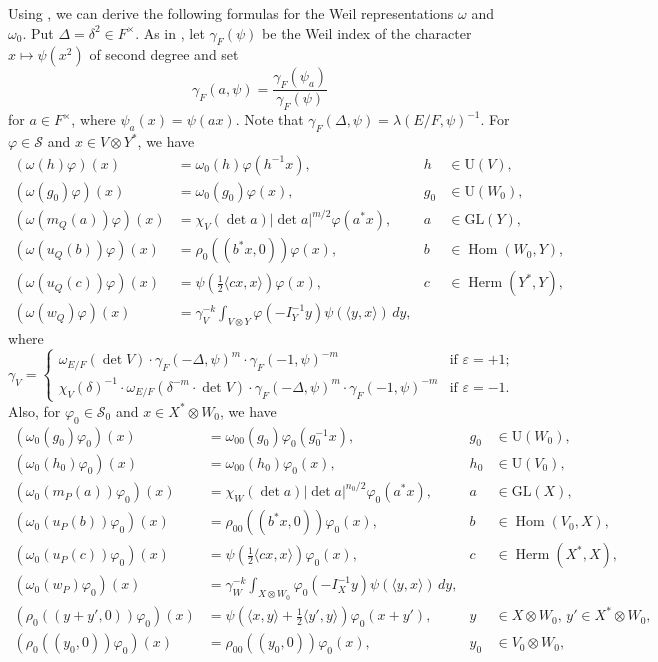\documentclass[11pt]{amsart}
\numberwithin{equation}{section}
\theoremstyle{plain}
\theoremstyle{definition}
\theoremstyle{remark}
\def\Herm{\operatorname{Herm}}
\def\Hom{\operatorname{Hom}}
\def\GL{\mathrm{GL}}
\def\U{\mathrm{U}}
\def\s{\mathscr{S}}
\begin{document}
Using \cite[Theorem 3.1]{k}, we can derive the following formulas for the Weil representations $\omega$ and $\omega_0$.
Put $\Delta = \delta^2 \in F^{\times}$.
As in \cite[Appendix]{rangarao}, let $\gamma_F(\psi)$ be the Weil index of the character $x \mapsto \psi(x^2)$ of second degree and set 
\[  \gamma_F(a,\psi) = \frac{\gamma_F(\psi_a)}{\gamma_F(\psi)} \]
for $a \in F^{\times}$, where $\psi_a(x) = \psi(ax)$.
Note that $\gamma_F(\Delta, \psi) = \lambda(E/F, \psi)^{-1}$.
For $\varphi \in \s$ and $x \in V \otimes Y^*$, we have 
\begin{align*}
 (\omega(h) \varphi)(x) & = \omega_0(h) \varphi(h^{-1} x), &
 h & \in \U(V), \\
 (\omega(g_0) \varphi)(x) & = \omega_0(g_0) \varphi(x), &
 g_0 & \in \U(W_0), \\
 (\omega(m_Q(a)) \varphi)(x) & = \chi_V(\det a) |\det a|^{m/2} \varphi(a^*x), &
 a & \in \GL(Y), \\ 
 (\omega(u_Q(b)) \varphi)(x) & = \rho_0((b^* x, 0)) \varphi(x), &
 b & \in \Hom(W_0, Y), \\
 (\omega(u_Q(c)) \varphi)(x) & = \psi(\tfrac{1}{2} \langle cx, x \rangle) \varphi(x), &
 c & \in \Herm(Y^*,Y), \\
 (\omega(w_Q) \varphi)(x) & = \gamma_V^{-k} 
 \int_{V \otimes Y} \varphi(-I_Y^{-1}y) \psi(\langle y, x\rangle) \, dy, & &
\end{align*}
where 
\[
 \gamma_V = 
 \begin{cases}
  \omega_{E/F}(\det V) \cdot \gamma_F(-\Delta, \psi)^m \cdot \gamma_F(-1,\psi)^{-m}
  & \text{if $\varepsilon = +1$;} \\
  \chi_V(\delta)^{-1} \cdot \omega_{E/F}(\delta^{-m} \cdot \det V) \cdot \gamma_F(-\Delta, \psi)^m \cdot \gamma_F(-1,\psi)^{-m}
  & \text{if $\varepsilon = -1$.}
 \end{cases}
\]
Also, for $\varphi_0 \in \s_0$ and $x \in X^* \otimes W_0$, we have
\begin{align*}
 (\omega_0(g_0) \varphi_0)(x) & = \omega_{00}(g_0) \varphi_0 (g_0^{-1} x), &
 g_0 & \in \U(W_0), \\
 (\omega_0(h_0) \varphi_0)(x) & = \omega_{00}(h_0) \varphi_0(x), & 
 h_0 & \in \U(V_0), \\
 (\omega_0(m_P(a)) \varphi_0)(x)
 & = \chi_W(\det a) |\det a|^{n_0/2} \varphi_0(a^*x), &
 a & \in \GL(X), \\
 (\omega_0(u_P(b)) \varphi_0)(x) & = \rho_{00}((b^*x, 0)) \varphi_0(x), &
 b & \in \Hom(V_0, X), \\
 (\omega_0(u_P(c)) \varphi_0)(x) & = \psi(\tfrac{1}{2} \langle cx, x \rangle ) \varphi_0(x), &
 c & \in \Herm(X^*, X), \\
 (\omega_0(w_P) \varphi_0)(x)
 & = \gamma_{W}^{-k} \int_{X \otimes W_0} \varphi_0(-I_X^{-1}y) \psi(\langle y,x \rangle) \, dy, & & \\
 (\rho_0((y+y',0)) \varphi_0)(x) & = \psi(\langle x, y \rangle + \tfrac{1}{2}\langle y', y \rangle)
 \varphi_0(x + y'), &
 y & \in X \otimes W_0, \, y' \in X^* \otimes W_0, \\
 (\rho_0((y_0,0)) \varphi_0)(x) & = \rho_{00}((y_0,0)) \varphi_0(x), & y_0 & \in V_0 \otimes W_0,
\end{align*}
\end{document}
